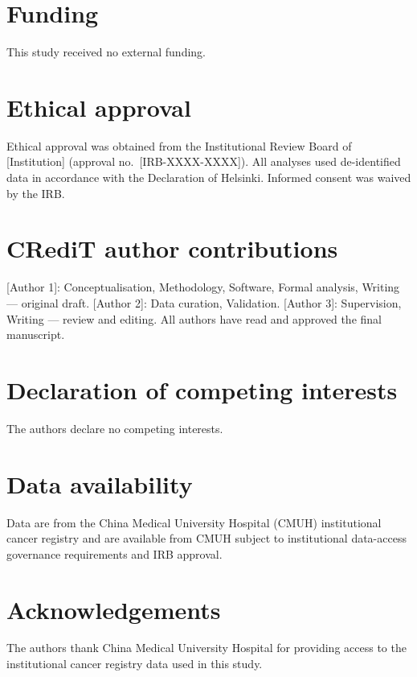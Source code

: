 \documentclass[review,12pt]{elsarticle}
\begin{document}
\section*{Funding}
This study received no external funding.

\section*{Ethical approval}
Ethical approval was obtained from the Institutional Review Board of [Institution]
(approval no.\ [IRB-XXXX-XXXX]). All analyses used de-identified data in
accordance with the Declaration of Helsinki. Informed consent was waived by
the IRB.

\section*{CRediT author contributions}
[Author 1]: Conceptualisation, Methodology, Software, Formal analysis,
Writing --- original draft. [Author 2]: Data curation, Validation.
[Author 3]: Supervision, Writing --- review and editing.
All authors have read and approved the final manuscript.

\section*{Declaration of competing interests}
The authors declare no competing interests.

\section*{Data availability}
Data are from the China Medical University Hospital (CMUH) institutional
cancer registry and are available from CMUH subject to institutional
data-access governance requirements and IRB approval.

\section*{Acknowledgements}
The authors thank China Medical University Hospital for providing access
to the institutional cancer registry data used in this study.
\end{document}
